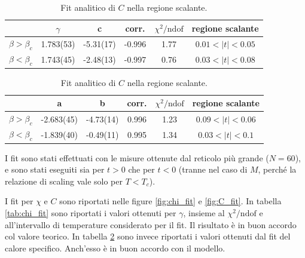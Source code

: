 \documentclass[a4paper,11pt]{article}
\newcommand{\chindof}{\chi^2 / \text{ndof}}
\begin{document}
	\begin{table}[hbt]
        \centering
        \begin{tabular}{c | c c c c c } \hline 
                                  & $\gamma$  & c    & corr. & $\chindof$ & regione scalante \\ \hline
                $\beta > \beta_c$ & 1.783(53) & -5.31(17)   & -0.996    & 1.77 & $0.01 < |t| < 0.05$ \\
                $\beta < \beta_c$ & 1.743(45) & -2.48(13)   &   -0.997 & 0.76 & $0.03 < |t| < 0.08$ \\ \hline
        \end{tabular}
        \caption{Fit analitico di $\chi$ nella regione scalante.}
        \label{tab:chi_fit}
        \vspace{5mm}
        \centering
        \begin{tabular}{c | c c c c c } \hline 
                                  & a  & b    & corr. & $\chindof$ & regione scalante \\ \hline
                $\beta > \beta_c$ & -2.683(45) & -4.73(14)   & 0.996   & 1.23 & $0.09 < |t| < 0.06$ \\
                $\beta < \beta_c$ & -1.839(40) & -0.49(11)   & 0.995   & 1.34 & $0.03 < |t| < 0.1$ \\ \hline
        \end{tabular}
        \caption{Fit analitico di $C$ nella regione scalante.}
        \label{tab:C_fit}
	\end{table}
	
	I fit sono stati effettuati con le misure ottenute dal reticolo più grande ($N = 60$), e sono stati eseguiti sia per $t > 0$ che per $t < 0$ (tranne nel caso di $M$, perché la relazione di scaling vale solo per $T < T_c$).
	
	I fit per $\chi$ e $C$ sono riportati nelle figure \ref{fig:chi_fit} e \ref{fig:C_fit}. In tabella \ref{tab:chi_fit} sono riportati i valori ottenuti per $\gamma$, insieme al $\chi^2 / \text{ndof}$ e all'intervallo di temperature considerato per il fit. Il risultato è in buon accordo col valore teorico. In tabella \ref{tab:C_fit} sono invece riportati i valori ottenuti dal fit del calore specifico. Anch'esso è in buon accordo con il modello.
\end{document}
